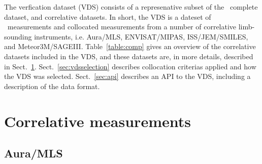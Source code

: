 The verfication dataset (VDS) consists of a represenative subset of 
the \smr\ complete dataset, and correlative datasets.
In short, the VDS is a dateset of \smr\ measurements 
and collocated measurements from a number of correlative
limb-sounding instruments, i.e. Aura/MLS, ENVISAT/MIPAS,
ISS/JEM/SMILES, and Meteor3M/SAGEIII.
Table~\ref{table:comp} gives an overview of the correlative
datasets included in the VDS, and these datasets
are, in more details, described in Sect.~\ref{sec:corrmeas}.
Sect.~\ref{sec:vdsselection} describes collocation criterias
applied and how the VDS was selected. 
Sect.~\ref{sec:api} describes an API to the VDS,
including a description of the data format. 
    


\section{Correlative measurements}
\label{sec:corrmeas}
\subsection{Aura/MLS}

